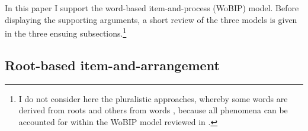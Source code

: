 \documentclass[output=paper,
modfonts
]{LSP/langsci}
\begin{document}
	
In this paper I support the word-based item-and-process (WoBIP) model. Before displaying the supporting arguments, a short review of the three
	models is given in the three ensuing subsections.\footnote{I do not consider here the pluralistic approaches, whereby some words
  are derived from roots and others from words \citep{McCarthy1979a,arad2005a,berman2012a}, because all phenomena can be accounted for within
  the WoBIP model reviewed in .}

\subsection{Root-based item-and-arrangement}\label{root-based-item-and-arrangement}\label{sec:batel:2.1}
\end{document}
